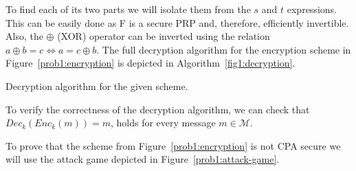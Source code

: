 To find each of its two parts we will isolate them from the $s$ and $t$ expressions.
This can be easily done as F is a secure PRP and, therefore, efficiently invertible.
Also, the $\oplus$ (XOR) operator can be inverted using the relation $a \oplus b = c \Leftrightarrow a = c \oplus b$.
The full decryption algorithm for the encryption scheme in Figure~\ref{prob1:encryption} is depicted in Algorithm~\ref{fig1:decryption}.
\begin{algorithm}
    \DontPrintSemicolon
    \caption{Decryption algorithm for the given scheme.\label{fig1:decryption}}
\end{algorithm}

To verify the correctness of the decryption algorithm, we can check that $Dec_k (Enc_k (m)) = m$, holds for every message $m \in \mathcal{M}$.


To prove that the scheme from Figure~\ref{prob1:encryption} is not CPA secure we will use the attack game depicted in Figure~\ref{prob1:attack-game}.


